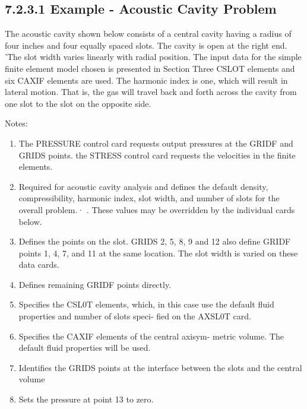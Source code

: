 \documentclass{article}
\begin{document}
\subsection{7.2.3.1 Example - Acoustic Cavity Problem}

The acoustic cavity shown below consists of a central cavity having a radius
of four inches and four equally spaced slots. The cavity is open at the
right end. 'The slot width varies linearly with radial position. The input
data for the simple finite element model chosen is presented in Section
Three CSLOT elements and six CAXIF elements are used. The harmonic index
is one, which will result in lateral motion. That is, the gas will travel
back and forth across the cavity from one slot to the slot on the opposite
side.

Notes:
\begin{enumerate}
    \item The PRESSURE control card requests output pressures
        at the GRIDF and GRIDS points. the STRESS control
        card requests the velocities
        in the finite elements.
    \item Required for acoustic cavity analysis and defines the
        default density, compressibility, harmonic index, slot
        width, and number of slots for the overall problem.· .
        These values may be overridden by the individual cards
        below.
    \item Defines the points on the slot. GRIDS 2, 5, 8, 9 and 12
        also define GRIDF points 1, 4, 7, and 11 at the same
        location. The slot width is varied on these data cards.
    \item Defines remaining GRIDF points directly.
    \item Specifies the CSL0T elements, which, in this case use
        the default fluid properties and number of slots speci-
        fied on the AXSL0T card.
    \item Specifies the CAXIF elements of the central axisym-
        metric volume. The default fluid properties will be
        used.
    \item Identifies the GRIDS points at the interface between
        the slots and the central volume
    \item Sets the pressure at point 13 to zero.


\end{enumerate}
\end{document}
